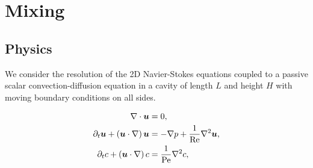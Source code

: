 \chapter{Mixing}

\section{Physics}

We consider the resolution of the 2D Navier-Stokes equations coupled to a passive scalar convection-diffusion equation in a cavity of length $L$ and height $H$ with moving boundary conditions on all sides. %

\begin{equation}
\label{eq:mixing}
\begin{split}
	\nabla \cdot \bm{u} 						&= 0, \\
	\partial_t \bm{u} + (\bm{u} \cdot \nabla) \, \bm{u} 	&= -\nabla p + \frac{1}{\text{Re}} \nabla^2 \bm{u}, \\
	\partial_t c + (\bm{u} \cdot \nabla) \, c 			&= \frac{1}{\text{Pe}} \nabla^2 c,
\end{split}
\end{equation}


